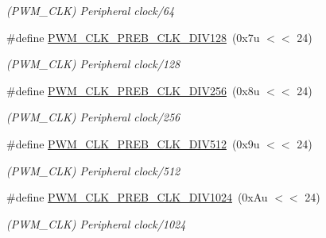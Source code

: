 \begin{DoxyCompactItemize}
\begin{DoxyCompactList}\small\item\em (P\+W\+M\+\_\+\+C\+LK) Peripheral clock/64 \end{DoxyCompactList}\item 
\mbox{\label{group__SAMV71__PWM_gae47109fac5979f7f7f1db16ae132e46c}} 
\#define \mbox{\hyperlink{group__SAMV71__PWM_gae47109fac5979f7f7f1db16ae132e46c}{P\+W\+M\+\_\+\+C\+L\+K\+\_\+\+P\+R\+E\+B\+\_\+\+C\+L\+K\+\_\+\+D\+I\+V128}}~(0x7u $<$$<$ 24)
\begin{DoxyCompactList}\small\item\em (P\+W\+M\+\_\+\+C\+LK) Peripheral clock/128 \end{DoxyCompactList}\item 
\mbox{\label{group__SAMV71__PWM_gaaf3614b1a76b5b63428c8231cc383504}} 
\#define \mbox{\hyperlink{group__SAMV71__PWM_gaaf3614b1a76b5b63428c8231cc383504}{P\+W\+M\+\_\+\+C\+L\+K\+\_\+\+P\+R\+E\+B\+\_\+\+C\+L\+K\+\_\+\+D\+I\+V256}}~(0x8u $<$$<$ 24)
\begin{DoxyCompactList}\small\item\em (P\+W\+M\+\_\+\+C\+LK) Peripheral clock/256 \end{DoxyCompactList}\item 
\mbox{\label{group__SAMV71__PWM_gaa53b1dd4e614b72e3637aa44763d1620}} 
\#define \mbox{\hyperlink{group__SAMV71__PWM_gaa53b1dd4e614b72e3637aa44763d1620}{P\+W\+M\+\_\+\+C\+L\+K\+\_\+\+P\+R\+E\+B\+\_\+\+C\+L\+K\+\_\+\+D\+I\+V512}}~(0x9u $<$$<$ 24)
\begin{DoxyCompactList}\small\item\em (P\+W\+M\+\_\+\+C\+LK) Peripheral clock/512 \end{DoxyCompactList}\item 
\mbox{\label{group__SAMV71__PWM_gae9f6d0e24b13520c2a68e86b083210e2}} 
\#define \mbox{\hyperlink{group__SAMV71__PWM_gae9f6d0e24b13520c2a68e86b083210e2}{P\+W\+M\+\_\+\+C\+L\+K\+\_\+\+P\+R\+E\+B\+\_\+\+C\+L\+K\+\_\+\+D\+I\+V1024}}~(0x\+Au $<$$<$ 24)
\begin{DoxyCompactList}\small\item\em (P\+W\+M\+\_\+\+C\+LK) Peripheral clock/1024 \end{DoxyCompactList}\item 
\mbox{\label{group__SAMV71__PWM_ga77c0afa3572c801d2b6cd0290b28aa4b}} 

\end{DoxyCompactItemize}
